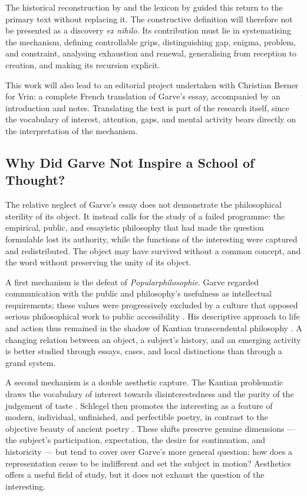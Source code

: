 \documentclass[11pt,a4paper]{article}
\begin{document}
The historical reconstruction by \textcite{nannini2018garve} and the lexicon by
\textcite{nannini2018interesting} guided this return to the primary text without
replacing it. The constructive definition will therefore not be presented as a
discovery \emph{ex nihilo}. Its contribution must lie in systematising the
mechanism, defining controllable grips, distinguishing gap, enigma, problem, and
constraint, analysing exhaustion and renewal, generalising from reception to
creation, and making its recursion explicit.

This work will also lead to an editorial project undertaken with Christian
Berner for Vrin: a complete French translation of Garve's essay,
accompanied by an introduction and notes. Translating the text is part of the
research itself, since the vocabulary of interest, attention, gaps, and mental
activity bears directly on the interpretation of the mechanism.

\subsection{Why Did Garve Not Inspire a School of Thought?}

The relative neglect of Garve's essay does not demonstrate the philosophical
sterility of its object. It instead calls for the study of a failed programme:
the empirical, public, and essayistic philosophy that had made the question
formulable lost its authority, while the functions of the interesting were
captured and redistributed. The object may have survived without a common
concept, and the word without preserving the unity of its object.

A first mechanism is the defeat of \emph{Popularphilosophie}. Garve regarded
communication with the public and philosophy's usefulness as intellectual
requirements; these values were progressively excluded by a culture that
opposed serious philosophical work to public accessibility
\parencite{thompson2018garve}. His descriptive approach to life and action thus
remained in the shadow of Kantian transcendental philosophy
\parencite{bachmannmedick2008anziehungskraft}. A changing relation between an
object, a subject's history, and an emerging activity is better studied through
essays, cases, and local distinctions than through a grand system.

A second mechanism is a double aesthetic capture. The Kantian problematic draws
the vocabulary of interest towards disinterestedness and the purity of the
judgement of taste \parencite{kant1993juger}. Schlegel then promotes the
interesting as a feature of modern, individual, unfinished, and perfectible
poetry, in contrast to the objective beauty of ancient poetry
\parencite{schlegel2001study,nannini2018interesting}. These shifts preserve
genuine dimensions --- the subject's participation, expectation, the desire for
continuation, and historicity --- but tend to cover over Garve's more general
question: how does a representation cease to be indifferent and set the subject
in motion? Aesthetics offers a useful field of study, but it does not exhaust
the question of the interesting.
\end{document}
